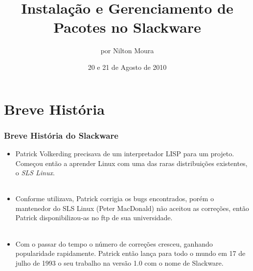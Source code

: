 \documentclass{beamer}
\date{20 e 21 de Agosto de 2010}
\begin{document}
\title{Instalação e Gerenciamento de Pacotes no Slackware}

\author[Nilton Moura]{por Nilton Moura}


\begin{frame}
	\titlepage
\end{frame}

\section{Breve História}
\begin{frame}
	\frametitle{Breve História do Slackware}
	\begin{itemize}
		\item Patrick Volkerding precisava de um interpretador LISP para um
			projeto. Começou então a aprender Linux com uma das raras
			distribuições existentes, o \textit{SLS Linux}.
		~\\
		~\\
		\item Conforme utilizava, Patrick corrigia os bugs encontrados, porém
			o mantenedor do SLS Linux (Peter MacDonald) não aceitou as
			correções, então Patrick disponibilizou-as no ftp de sua
			universidade.
		~\\
		~\\
		\item Com o passar do tempo o número de correções cresceu, ganhando
			popularidade rapidamente. Patrick então lança para todo o mundo
			em 17 de julho de 1993 o seu trabalho na versão 1.0 com o nome de
			Slackware.
	\end{itemize}
\end{frame}
\end{document}
